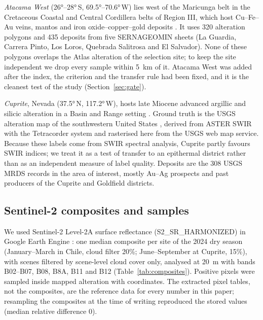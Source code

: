 \documentclass[preprint,authoryear,number]{elsarticle}
\begin{document}
\emph{Atacama West} (\ang{26}--\ang{28}\,S, \ang{69.5}--\ang{70.6}\,W) lies west of the Maricunga belt in the Cretaceous Coastal and Central Cordillera belts of Region III, which host Cu--Fe--Au veins, mantos and iron oxide--copper--gold deposits \citep{Sillitoe2003}. It uses 320 alteration polygons and 435 deposits from five SERNAGEOMIN sheets (La Guardia, Carrera Pinto, Los Loros, Quebrada Salitrosa and El Salvador). None of these polygons overlaps the Atlas alteration of the selection site; to keep the site independent we drop every sample within \SI{5}{\kilo\meter} of it. Atacama West was added after the index, the criterion and the transfer rule had been fixed, and it is the cleanest test of the study (Section~\ref{sec:gate}).

\emph{Cuprite}, Nevada (\ang{37.5}\,N, \ang{117.2}\,W), hosts late Miocene advanced argillic and silicic alteration in a Basin and Range setting \citep{Swayze2014}. Ground truth is the USGS alteration map of the southwestern United States \citep{Rockwell2017}, derived from ASTER SWIR with the Tetracorder system and rasterised here from the USGS web map service. Because these labels come from SWIR spectral analysis, Cuprite partly favours SWIR indices; we treat it as a test of transfer to an epithermal district rather than as an independent measure of label quality. Deposits are the 308 USGS MRDS records in the area of interest, mostly Au--Ag prospects and past producers of the Cuprite and Goldfield districts.

\subsection{Sentinel-2 composites and samples}

We used Sentinel-2 Level-2A surface reflectance (S2\_SR\_HARMONIZED) in Google Earth Engine \citep{Gorelick2017}: one median composite per site of the 2024 dry season (January--March in Chile, cloud filter 20\%; June--September at Cuprite, 15\%), with scenes filtered by scene-level cloud cover only, analysed at \SI{20}{\meter} with bands B02--B07, B08, B8A, B11 and B12 (Table~\ref{tab:composites}). Positive pixels were sampled inside mapped alteration with coordinates. The extracted pixel tables, not the composites, are the reference data for every number in this paper; resampling the composites at the time of writing reproduced the stored values (median relative difference 0).
\end{document}
